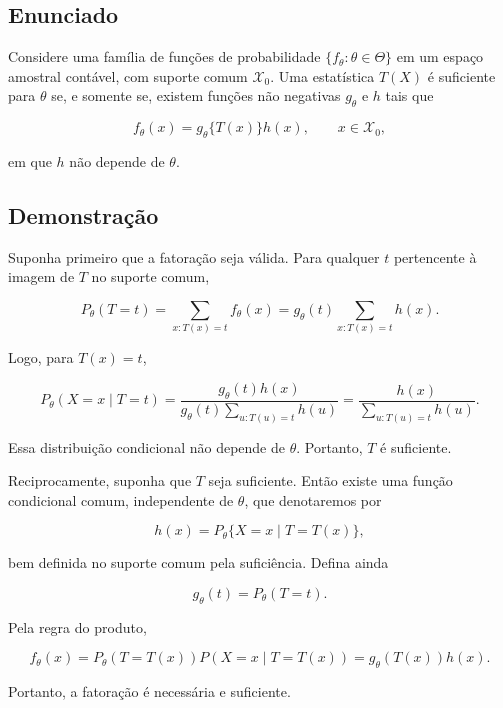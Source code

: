 \documentclass[
  letterpaper,
  DIV=11,
  numbers=noendperiod]{scrreprt}
\begin{document}
\subsection*{Enunciado}\label{enunciado-5}

Considere uma família de funções de probabilidade
\(\{f_\theta:\theta\in\Theta\}\) em um espaço amostral contável, com
suporte comum \(\mathcal X_0\). Uma estatística \(T(X)\) é suficiente
para \(\theta\) se, e somente se, existem funções não negativas
\(g_\theta\) e \(h\) tais que

\[
f_\theta(x)=g_\theta\{T(x)\}h(x),
\qquad x\in\mathcal X_0,
\]

em que \(h\) não depende de \(\theta\).

\subsection*{Demonstração}\label{demonstrauxe7uxe3o-6}

Suponha primeiro que a fatoração seja válida. Para qualquer \(t\)
pertencente à imagem de \(T\) no suporte comum,

\[
P_\theta(T=t)
=
\sum_{x:T(x)=t}f_\theta(x)
=
g_\theta(t)\sum_{x:T(x)=t}h(x).
\]

Logo, para \(T(x)=t\),

\[
P_\theta(X=x\mid T=t)
=
\frac{g_\theta(t)h(x)}{g_\theta(t)\sum_{u:T(u)=t}h(u)}
=
\frac{h(x)}{\sum_{u:T(u)=t}h(u)}.
\]

Essa distribuição condicional não depende de \(\theta\). Portanto, \(T\)
é suficiente.

Reciprocamente, suponha que \(T\) seja suficiente. Então existe uma
função condicional comum, independente de \(\theta\), que denotaremos
por

\[
h(x)=P_\theta\{X=x\mid T=T(x)\},
\]

bem definida no suporte comum pela suficiência. Defina ainda

\[
g_\theta(t)=P_\theta(T=t).
\]

Pela regra do produto,

\[
f_\theta(x)
=
P_\theta(T=T(x))P(X=x\mid T=T(x))
=
g_\theta(T(x))h(x).
\]

Portanto, a fatoração é necessária e suficiente.
\end{document}
